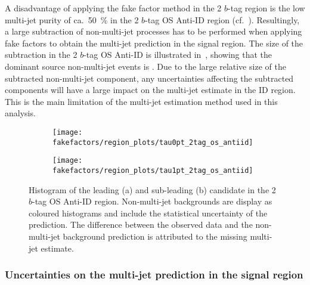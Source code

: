 A disadvantage of applying the fake factor method in the 2 $b$-tag
region is the low multi-jet purity of ca.\ \SI{50}{\percent} in the 2
$b$-tag OS Anti-ID region (cf.\
). Resultingly, a large subtraction of
non-multi-jet processes has to be performed when applying fake factors
to obtain the multi-jet prediction in the signal region.  The size of
the subtraction in the 2 $b$-tag OS Anti-ID is illustrated
in~, showing that the dominant source
non-multi-jet events is \ttbarFakes. Due to the large relative size of
the subtracted non-multi-jet component, any uncertainties affecting
the subtracted components will have a large impact on the multi-jet
estimate in the ID region. This is the main limitation of the
multi-jet estimation method used in this analysis.


\begin{figure}[htbp]
  \centering

  \begin{subfigure}{0.49\textwidth}
    \texttt{[image: fakefactors/region\_plots/tau0pt\_2tag\_os\_antiid]}
    \subcaption{}
  \end{subfigure}
  \begin{subfigure}{0.49\textwidth}
    \texttt{[image: fakefactors/region\_plots/tau1pt\_2tag\_os\_antiid]}
    \subcaption{}
  \end{subfigure}

  \caption{Histogram of the leading (a) and sub-leading (b) \tauhadvis
    candidate \pT in the 2 $b$-tag OS Anti-ID region. Non-multi-jet
    backgrounds are display as coloured histograms and include the
    statistical uncertainty of the prediction. The difference between
    the observed data and the non-multi-jet background prediction is
    attributed to the missing multi-jet estimate.}
  \label{fig:mjfakes_2tag_os_antiid}
\end{figure}


\subsubsection{Uncertainties on the multi-jet prediction in the
  \hadhad signal region}

%

